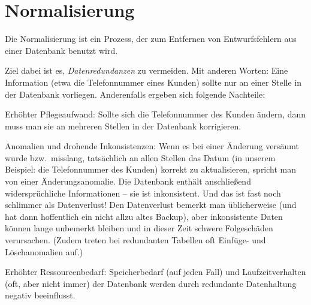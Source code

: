 \chapter{Normalisierung \tagLK}
\renewcommand{\chaptertitle}{Normalisierung}

\lehead[]{\normalfont\sffamily\hspace*{-2.00cm}\textcolor{white}{\colorbox{lightblue}{\makebox[1.60cm][r]{\thechapter}}}\hspace{0.17cm}\textcolor{lightblue}{\chaptertitle}}
\rohead[]{\textcolor{lightblue}{\chaptertitle}\normalfont\sffamily\hspace*{0.17cm}\textcolor{white}{\colorbox{lightblue}{\makebox[1.60cm][l]{\thechapter}}}\hspace{-2.00cm}}
\rehead[]{\textcolor{lightblue}{AvHG, Inf, My}}
\lohead[]{\textcolor{lightblue}{AvHG, Inf, My}}

Die Normalisierung ist ein Prozess, der zum Entfernen von Entwurfsfehlern aus
einer Datenbank benutzt wird.

Ziel dabei ist es, \emph{Datenredundanzen} zu vermeiden. Mit anderen Worten:
Eine Information (etwa die Telefonnummer eines Kunden) sollte nur an einer
Stelle in der Datenbank vorliegen. Anderenfalls ergeben sich folgende Nachteile:

\begin{compactitem}
\item Erhöhter Pflegeaufwand: Sollte sich die Telefonnummer des Kunden ändern,
dann muss man sie an mehreren Stellen in der Datenbank korrigieren.
\item Anomalien und drohende Inkonsistenzen: Wenn es bei einer Änderung
versäumt wurde bzw.\ misslang, tatsächlich an allen Stellen das Datum (in
unserem Beispiel: die Telefonnummer des Kunden) korrekt zu aktualisieren,
spricht man von einer Änderungsanomalie. Die Datenbank enthält anschließend
widersprüchliche Informationen -- sie ist inkonsistent. Und das ist fast noch
schlimmer als Datenverlust! Den Datenverlust bemerkt man üblicherweise (und
hat dann hoffentlich ein nicht allzu altes Backup), aber inkonsistente Daten
können lange unbemerkt bleiben und in dieser Zeit schwere Folgeschäden
verursachen. (Zudem treten bei redundanten Tabellen oft Einfüge- und
Löschanomalien auf.)
\item Erhöhter Ressourcenbedarf: Speicherbedarf (auf jeden Fall) und
Laufzeitverhalten (oft, aber nicht immer) der Datenbank werden durch redundante
Datenhaltung negativ beeinflusst.
\end{compactitem}

